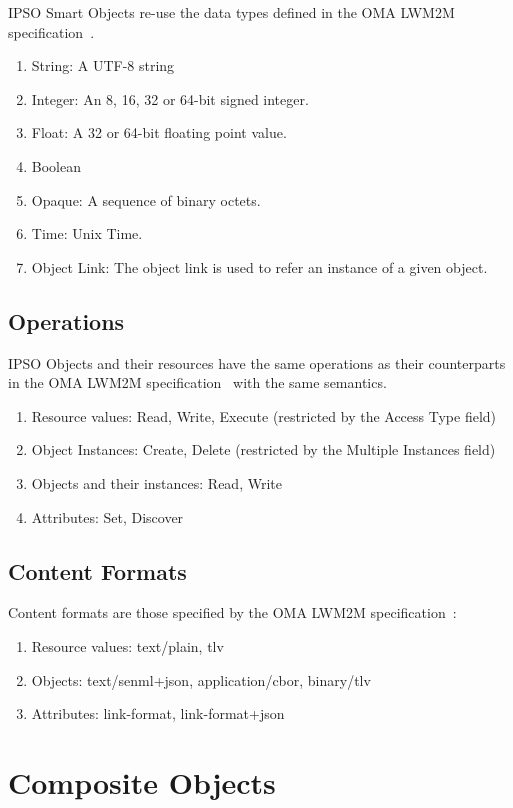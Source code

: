 \documentclass[peerreview, a4paper, 7pt]{IEEEtran}
\begin{document}
IPSO Smart Objects re-use the data types defined in the OMA LWM2M specification~\cite{lwm2m}.

\begin{enumerate}
\item String: A UTF-8 string
\item Integer: An 8, 16, 32 or 64-bit signed integer.
\item Float: A 32 or 64-bit floating point value.
\item Boolean
\item Opaque: A sequence of binary octets.
\item Time: Unix Time.
\item Object Link: The object link is used to refer an instance of a given object. 
\end{enumerate}

\subsection{Operations}

IPSO Objects and their resources have the same operations as their counterparts in the OMA LWM2M specification~\cite{lwm2m} with the same semantics.

\begin{enumerate}
\item Resource values: Read, Write, Execute (restricted by the Access Type field)
\item Object Instances: Create, Delete (restricted by the Multiple Instances field)
\item Objects and their instances: Read, Write
\item Attributes: Set, Discover
\end{enumerate}

\subsection{Content Formats}

Content formats are those specified by the OMA LWM2M specification~\cite{lwm2m}:
\begin{enumerate}
\item Resource values: text/plain, tlv
\item Objects: text/senml+json, application/cbor, binary/tlv
\item Attributes: link-format, link-format+json
\end{enumerate}


\section{Composite Objects}
\end{document}
